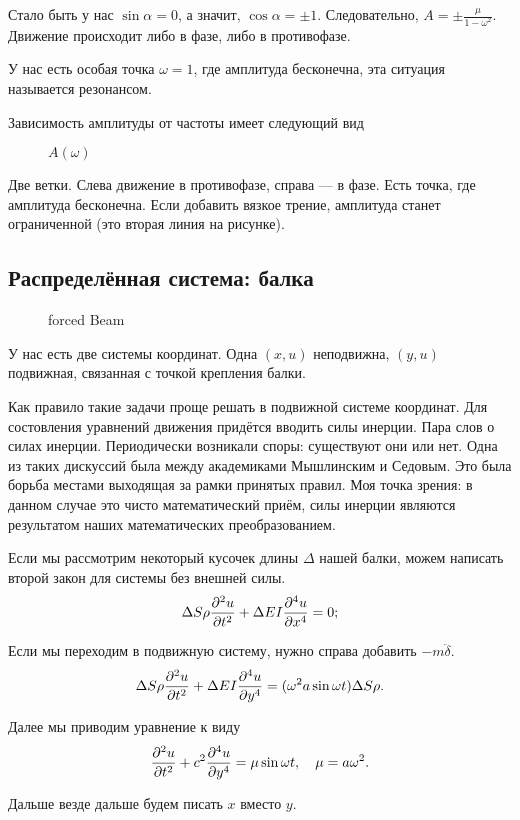 Стало быть у нас $\sin\alpha = 0$, а значит, $\cos\alpha = \pm 1$. Следовательно, $A = \pm \frac{\mu}{1-\omega^2}$.
Движение происходит либо в фазе, либо в противофазе.

У нас есть особая точка $\omega = 1$, где амплитуда бесконечна, эта ситуация называется резонансом.

Зависимость амплитуды от частоты имеет следующий вид
\begin{figure}[H]
  \centering
  \caption{$A(\omega)$}
  \label{fig:omegaa}
\end{figure}

Две ветки. Слева движение в противофазе, справа --- в фазе. Есть точка, где амплитуда бесконечна. Если добавить вязкое трение, амплитуда станет ограниченной (это вторая линия на рисунке).

\subsection{Распределённая система: балка}
\begin{figure}[H]
  \centering
  \caption{forced Beam}
  \label{fig:forcedbeam}
\end{figure}
У нас есть две системы координат. Одна $(x,u)$ неподвижна, $(y, u) $ подвижная, связанная с точкой крепления балки.

Как правило такие задачи проще решать в подвижной системе координат. Для состовления уравнений движения придётся вводить силы инерции.
Пара слов о силах инерции. Периодически возникали споры: существуют они или нет. Одна из таких дискуссий была между академиками Мышлинским и Седовым. Это была борьба местами выходящая за рамки принятых правил.
Моя точка зрения: в данном случае это чисто математический приём, силы инерции являются результатом наших математических преобразованием.


Если мы рассмотрим некоторый кусочек длины $\Delta$ нашей балки, можем написать второй  закон для системы без внешней силы.
\[
  \Delta S \rho \frac{\partial ^2u}{\partial t^2} + \Delta E I\frac{\partial ^4u}{\partial x^4} = 0;
\]

Если мы переходим в подвижную систему, нужно справа добавить $- m \ddot\delta$.
\[
  \Delta S \rho \frac{\partial ^2u}{\partial t^2} + \Delta E I \frac{\partial ^4u}{\partial y^4} = (\omega^2 a\sin\omega t)\Delta S \rho.
\]

Далее мы приводим уравнение к виду
\[
  \frac{\partial ^2u}{\partial t^2} + c^2 \frac{\partial ^4u}{\partial y^4} = \mu \sin\omega t,
  \quad \mu = a\omega^2.
\]

Дальше везде дальше будем писать $x$ вместо $y$.

